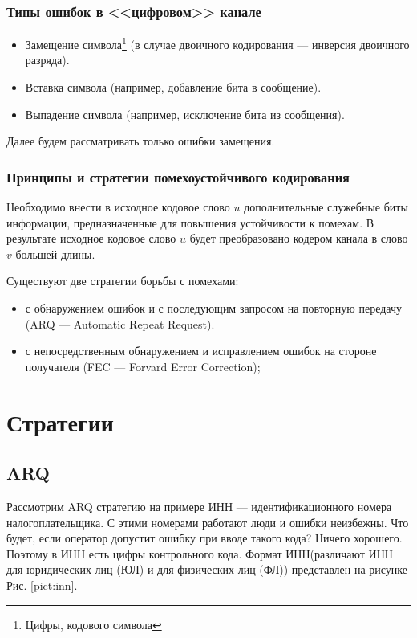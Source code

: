 \begin{frame}
    \frametitle{Типы ошибок в <<цифровом>> канале}
    
    \begin{itemize}
        \item \alert{Замещение} символа\footnote{Цифры, кодового символа} (в случае двоичного кодирования --- инверсия двоичного разряда).
        
        \item Вставка символа (например, добавление бита в сообщение).
        
        \item Выпадение символа (например, исключение бита из сообщения).
    \end{itemize} 
    Далее будем рассматривать только ошибки \alert{замещения}.
\end{frame}


\begin{frame}
    \frametitle{Принципы и стратегии помехоустойчивого кодирования}
    
    Необходимо внести в исходное кодовое слово $u$ дополнительные служебные биты информации, предназначенные для повышения устойчивости к помехам. В результате исходное кодовое слово $u$ будет преобразовано кодером канала в слово $v$ большей длины.
    
    Существуют две стратегии борьбы с помехами:
    \begin{itemize}
        \item с обнаружением ошибок и с последующим запросом на повторную передачу (ARQ --- Automatic Repeat Request).
    
        \item с непосредственным обнаружением и исправлением ошибок на стороне получателя (FEC --- Forvard Error Correction);        
    \end{itemize}
\end{frame}


\section{Стратегии}


\subsection{ARQ}


Рассмотрим ARQ стратегию на примере ИНН --- идентификационного номера налогоплательщика. С этими номерами работают люди и ошибки неизбежны. Что будет, если оператор допустит ошибку при вводе такого кода? Ничего хорошего. Поэтому в ИНН есть цифры контрольного кода. Формат ИНН(различают ИНН для юридических лиц (ЮЛ) и для физических лиц (ФЛ)) представлен на рисунке Рис. \ref{pict:inn}. 

